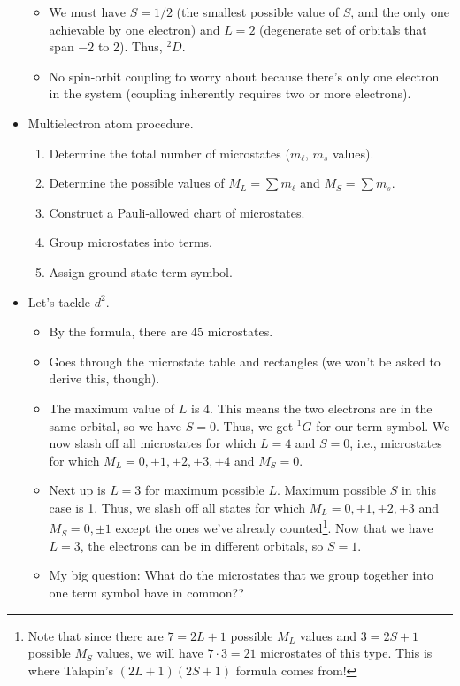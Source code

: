 \documentclass[../notes.tex]{subfiles}
\begin{document}
\begin{itemize}
\begin{itemize}
        \item We must have $S=1/2$ (the smallest possible value of $S$, and the only one achievable by one electron) and $L=2$ (degenerate set of orbitals that span $-2$ to 2). Thus, ${}^2D$.
        \item No spin-orbit coupling to worry about because there's only one electron in the system (coupling inherently requires two or more electrons).
    \end{itemize}
    \item Multielectron atom procedure.
    \begin{enumerate}
        \item Determine the total number of microstates ($m_\ell$, $m_s$ values).
        \item Determine the possible values of $M_L=\sum m_\ell$ and $M_S=\sum m_s$.
        \item Construct a Pauli-allowed chart of microstates.
        \item Group microstates into terms.
        \item Assign ground state term symbol.
    \end{enumerate}
    \item Let's tackle $d^2$.
    \begin{itemize}
        \item By the formula, there are 45 microstates.
        \item Goes through the microstate table and rectangles (we won't be asked to derive this, though).
        \item The maximum value of $L$ is 4. This means the two electrons are in the same orbital, so we have $S=0$. Thus, we get ${}^1G$ for our term symbol. We now slash off all microstates for which $L=4$ and $S=0$, i.e., microstates for which $M_L=0,\pm 1,\pm 2,\pm 3,\pm 4$ and $M_S=0$.
        \item Next up is $L=3$ for maximum possible $L$. Maximum possible $S$ in this case is 1. Thus, we slash off all states for which $M_L=0,\pm 1,\pm 2,\pm 3$ and $M_S=0,\pm 1$ except the ones we've already counted\footnote{Note that since there are $7=2L+1$ possible $M_L$ values and $3=2S+1$ possible $M_S$ values, we will have $7\cdot 3=21$ microstates of this type. This is where Talapin's $(2L+1)(2S+1)$ formula comes from!}. Now that we have $L=3$, the electrons can be in different orbitals, so $S=1$.
        \item My big question: What do the microstates that we group together into one term symbol have in common??

\end{itemize}
\end{itemize}
\end{document}
